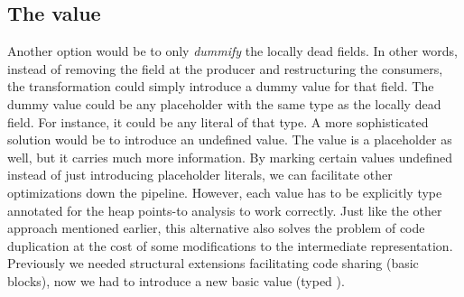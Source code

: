 \documentclass[main.tex]{subfiles}
\begin{document}
	\subsection{The  value}
	\label{subsec:undefined}
	
	Another option would be to only \emph{dummify} the locally dead fields. In other words, instead of removing the field at the producer and restructuring the consumers, the transformation could simply introduce a dummy value for that field. The dummy value could be any placeholder with the same type as the locally dead field. For instance, it could be any literal of that type. A more sophisticated solution would be to introduce an undefined value. The  value is a placeholder as well, but it carries much more information. By marking certain values undefined instead of just introducing placeholder literals, we can facilitate other optimizations down the pipeline. However, each  value has to be explicitly type annotated for the heap points-to analysis to work correctly. Just like the other approach mentioned earlier, this alternative also solves the problem of code duplication at the cost of some modifications to the intermediate representation. Previously we needed structural extensions facilitating code sharing (basic blocks), now we had to introduce a new basic value (typed ).
	
\end{document}
